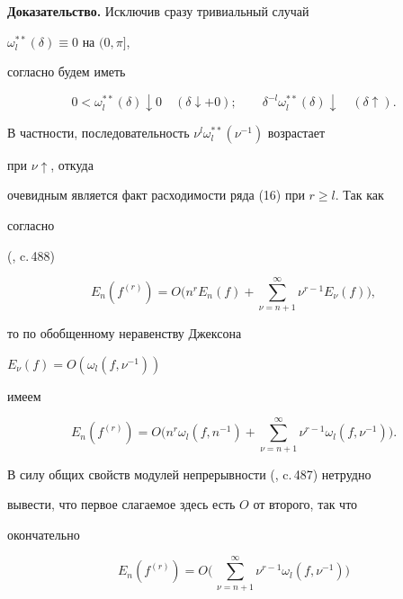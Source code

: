 \addtocounter{footnote}{-1}





{\bf Доказательство.} Исключив сразу тривиальный случай


$\omega^{**}_l(\delta)\equiv 0$ на $(0,\pi]$,


согласно \cite{St} будем иметь


\begin{equation}


0<\omega^{**}_l(\delta)\downarrow 0 \quad (\delta\downarrow +0);\qquad


\delta^{-l}\omega^{**}_l(\delta)\downarrow \quad (\delta\uparrow).


\end{equation}


В частности, последовательность $\nu^l\omega^{**}_l(\nu^{-1})$ возрастает


при $\nu\uparrow$, откуда


очевидным является факт расходимости ряда (16) при $r\ge l$. Так как


согласно


(\cite{Bar}, c.\,488)


$$


E_n(f^{(r)})=O\biggl(n^rE_n(f)+\sum^\infty_{\nu=n+1}\nu^{r-1}


E_\nu(f)\biggr),


$$


то по обобщенному неравенству Джексона


$E_\nu(f)=O(\omega_l(f,\nu^{-1}))$


имеем


$$


E_n(f^{(r)})=O\biggl(n^r\omega_l(f,n^{-1})+\sum^\infty_{\nu=n+1}


\nu^{r-1}\omega_l(f,\nu^{-1})\biggr).


$$


В силу общих свойств модулей непрерывности (\cite{Bar}, c.\,487) нетрудно


вывести, что первое слагаемое здесь есть $O$ от второго, так что


окончательно


\begin{equation}


E_n(f^{(r)})=O\biggl(\,\sum^\infty_{\nu=n+1}\nu^{r-1}\omega_l


(f,\nu^{-1})\biggr)


\end{equation}


